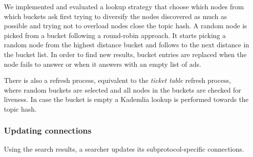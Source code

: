 We implemented and evaluated a lookup strategy that choose which nodes from which buckets ask first trying to diversify the nodes discovered as much as possible and trying not to overload nodes close the topic hash.
A random node is picked from a bucket following a round-robin approach. 
It starts picking a random node from the highest distance bucket and follows to the next distance in the bucket list.
In order to find new results,  bucket entries are replaced when the node fails to answer or when it answers with an empty list of ads. 

There is also a refresh process,  equivalent to the \emph{ticket table} refresh process, where random buckets are selected and all nodes in the buckets are checked for liveness.
In case the bucket is empty a Kademlia lookup is performed towards the topic hash.

\subsubsection{Updating connections}

Using the search results, a searcher updates its subprotocol-specific connections. 


